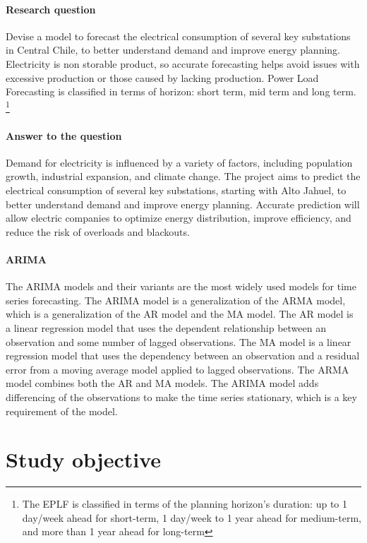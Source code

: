 \documentclass{ieeeaccess}
\begin{document}
\paragraph{Research question} Devise a model to forecast the electrical consumption of several 
key substations in Central Chile, to better understand demand and improve energy planning. 
Electricity is non storable product, so accurate forecasting helps avoid issues with excessive 
production or those caused by lacking production. Power Load Forecasting is classified in terms
 of horizon: short term, mid term and long term. \footnote{The EPLF is classified in terms of
the planning horizon’s duration: up to 1 day/week ahead for short-term, 1 day/week to 1 year
ahead for medium-term, and more than 1 year ahead for long-term}

\paragraph{Answer to the question} Demand for electricity is influenced by a variety of factors, including population growth, industrial expansion, and climate change. The project aims to predict the electrical consumption of several key substations, starting with Alto Jahuel, to better understand demand and improve energy planning. Accurate prediction will allow electric companies to optimize energy distribution, improve efficiency, and reduce the risk of overloads and blackouts.

\paragraph{ARIMA} The ARIMA models and their variants are the most widely used models for time series forecasting. The ARIMA model is a generalization of the ARMA model, which is a generalization of the AR model and the MA model. The AR model is a linear regression model that uses the dependent relationship between an observation and some number of lagged observations. The MA model is a linear regression model that uses the dependency between an observation and a residual error from a moving average model applied to lagged observations. The ARMA model combines both the AR and MA models. The ARIMA model adds differencing of the observations to make the time series stationary, which is a key requirement of the model.

\section{Study objective}\label{s:section}
\end{document}
